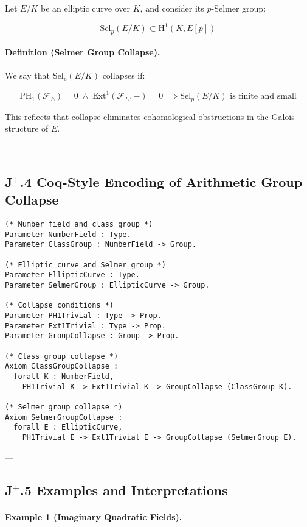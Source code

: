 \documentclass[11pt]{article}
\begin{document}
Let $E/K$ be an elliptic curve over $K$, and consider its $p$-Selmer group:

\[
\mathrm{Sel}_p(E/K) \subset \mathrm{H}^1(K, E[p])
\]

\paragraph{Definition (Selmer Group Collapse).}

We say that $\mathrm{Sel}_p(E/K)$ collapses if:

\[
\mathrm{PH}_1(\mathcal{F}_E) = 0 \;\land\; \mathrm{Ext}^1(\mathcal{F}_E, -) = 0 \implies \mathrm{Sel}_p(E/K) \text{ is finite and small}
\]

This reflects that collapse eliminates cohomological obstructions in the Galois structure of $E$.

---

\subsection*{J$^{+}$.4 Coq-Style Encoding of Arithmetic Group Collapse}

\begin{lstlisting}[language=Coq]
(* Number field and class group *)
Parameter NumberField : Type.
Parameter ClassGroup : NumberField -> Group.

(* Elliptic curve and Selmer group *)
Parameter EllipticCurve : Type.
Parameter SelmerGroup : EllipticCurve -> Group.

(* Collapse conditions *)
Parameter PH1Trivial : Type -> Prop.
Parameter Ext1Trivial : Type -> Prop.
Parameter GroupCollapse : Group -> Prop.

(* Class group collapse *)
Axiom ClassGroupCollapse :
  forall K : NumberField,
    PH1Trivial K -> Ext1Trivial K -> GroupCollapse (ClassGroup K).

(* Selmer group collapse *)
Axiom SelmerGroupCollapse :
  forall E : EllipticCurve,
    PH1Trivial E -> Ext1Trivial E -> GroupCollapse (SelmerGroup E).
\end{lstlisting}

---

\subsection*{J$^{+}$.5 Examples and Interpretations}

\paragraph{Example 1 (Imaginary Quadratic Fields).}
\end{document}
